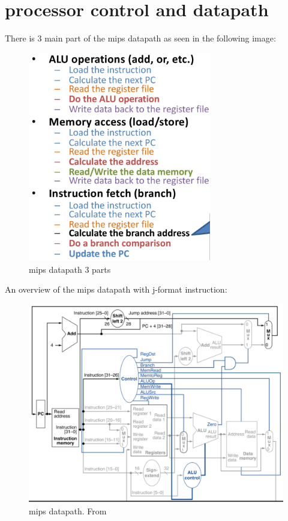 \section{processor control and datapath}
There is 3 main part of the mips datapath as seen in the following image:
\begin{figure}[H]
    \centering
    \includegraphics[width=8cm]{image/mips-datapath-3parts.png} 
    \caption{mips datapath 3 parts}
    \label{mips-datapath-3parts}
\end{figure}

An overview of the mips datapath with j-format instruction:
\begin{figure}[H]
    \centering
    \includegraphics[width=16cm]{image/mips-datapath.png} 
    \caption{mips datapath. From \cite{ca}}
    \label{mips-datapath}
\end{figure}

